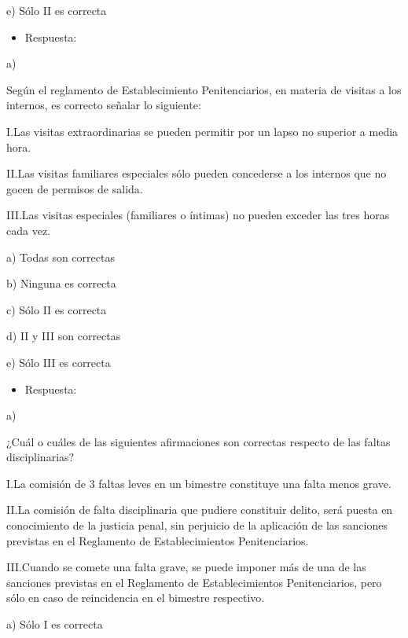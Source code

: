 \documentclass[letterpaper, 11pt]{article}
\begin{document}
e) Sólo II es correcta


\begin{itemize}
\item Respuesta:
\end{itemize}

a)



Según el reglamento de Establecimiento Penitenciarios, en materia de
visitas a los internos, es correcto señalar lo siguiente:


I.Las visitas extraordinarias se pueden permitir por un lapso no
superior a media hora.



II.Las visitas familiares especiales sólo pueden concederse a los
internos que no gocen de permisos de salida.



III.Las visitas especiales (familiares o íntimas) no pueden exceder
las tres horas cada vez.




a) Todas son correctas

b) Ninguna es correcta

c) Sólo II es correcta

d) II y III son correctas

e) Sólo III es correcta


\begin{itemize}
\item Respuesta:
\end{itemize}

a)


¿Cuál o cuáles de las siguientes afirmaciones son correctas respecto
de las faltas disciplinarias?

I.La comisión de 3 faltas leves en un bimestre constituye una falta
menos grave.



II.La comisión de falta disciplinaria que pudiere constituir delito,
será puesta en conocimiento de la justicia penal, sin perjuicio de la
aplicación de las sanciones previstas en el Reglamento de
Establecimientos Penitenciarios.



III.Cuando se comete una falta grave, se puede imponer más de una de
las sanciones previstas en el Reglamento de Establecimientos
Penitenciarios, pero sólo en caso de reincidencia en el bimestre
respectivo.




a) Sólo I es correcta
\end{document}
